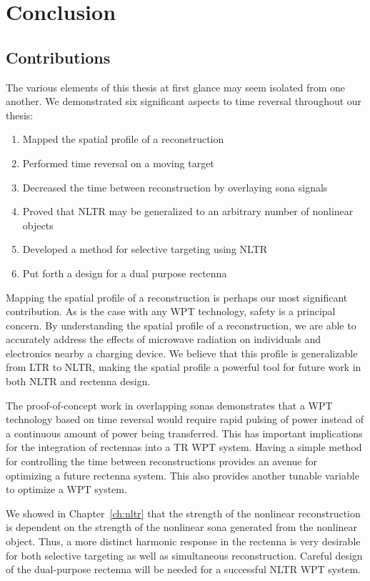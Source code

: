 \chapter{Conclusion}

\label{ch:conclusion}

\section{Contributions}

The various elements of this thesis at first glance may seem isolated from one another. We demonstrated six significant aspects to time reversal throughout our thesis:

\begin{enumerate}
\item Mapped the spatial profile of a reconstruction
\item Performed time reversal on a moving target
\item Decreased the time between reconstruction by overlaying sona signals
\item Proved that NLTR may be generalized to an arbitrary number of nonlinear objects
\item Developed a method for selective targeting using NLTR
\item Put forth a design for a dual purpose rectenna
\end{enumerate}

Mapping the spatial profile of a reconstruction is perhaps our most significant contribution. As is the case with any WPT technology, safety is a principal concern. By understanding the spatial profile of a reconstruction, we are able to accurately address the effects of microwave radiation on individuals and electronics nearby a charging device. We believe that this profile is generalizable from LTR to NLTR, making the spatial profile a powerful tool for future work in both NLTR and rectenna design.

The proof-of-concept work in overlapping sonas demonstrates that a WPT technology based on time reversal would require rapid pulsing of power instead of a continuous amount of power being transferred. This has important implications for the integration of rectennas into a TR WPT system. Having a simple method for controlling the time between reconstructions provides an avenue for optimizing a future rectenna system. This also provides another tunable variable to optimize a WPT system.

We showed in Chapter~\ref{ch:nltr} that the strength of the nonlinear reconstruction is dependent on the strength of the nonlinear sona generated from the nonlinear object. Thus, a more distinct harmonic response in the rectenna is very desirable for both selective targeting as well as simultaneous reconstruction. Careful design of the dual-purpose rectenna will be needed for a successful NLTR WPT system.

